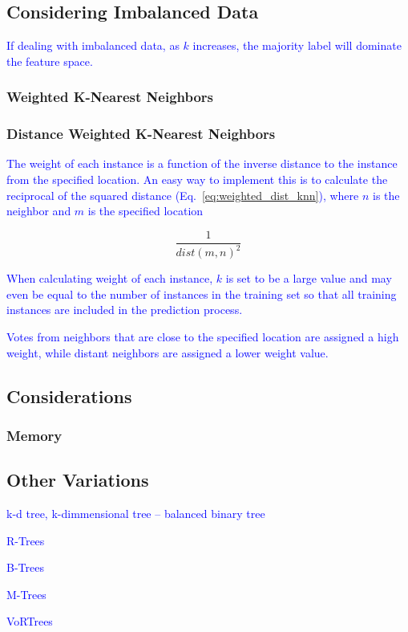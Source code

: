 \subsection{Considering Imbalanced Data}

\textcolor{blue}{If dealing with imbalanced data, as $k$ increases, the majority label will dominate the feature space.}

\subsubsection{Weighted K-Nearest Neighbors}



\subsubsection{Distance Weighted K-Nearest Neighbors}

\textcolor{blue}{The weight of each instance is a function of the inverse distance to the instance from the specified location. An easy way to implement this is to calculate the reciprocal of the squared distance (Eq.~\ref{eq:weighted_dist_knn}), where $n$ is the neighbor and $m$ is the specified location}

\begin{equation}
{\frac{1}{{dist(m,n)}^2}}
\label{eq:weighted_dist_knn}
\end{equation}

\textcolor{blue}{When calculating weight of each instance, $k$ is set to be a large value and may even be equal to the number of instances in the training set so that all training instances are included in the prediction process.}

\textcolor{blue}{Votes from neighbors that are close to the specified location are assigned a high weight, while distant neighbors are assigned a lower weight value.}

\subsection{Considerations}

\subsubsection{Memory}

\subsection{Other Variations}

\textcolor{blue}{k-d tree, k-dimmensional tree -- balanced binary tree}

\textcolor{blue}{R-Trees}

\textcolor{blue}{B-Trees}

\textcolor{blue}{M-Trees}

\textcolor{blue}{VoRTrees}